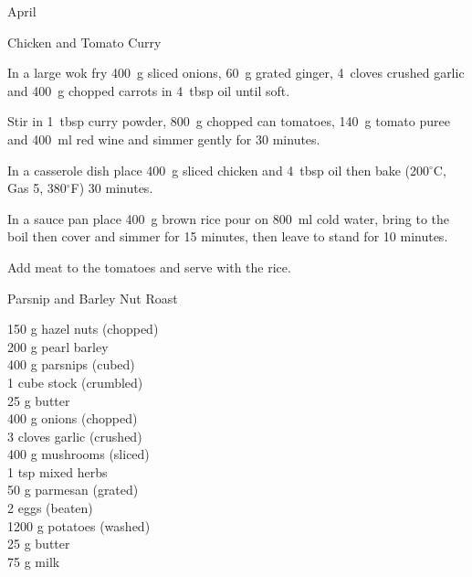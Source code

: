 \begin{menu}{April}
\begin{recipe}{2}{Chicken and Tomato Curry}
    \begin{instructions}
    \item 
        In a large wok fry
        400~g sliced onions,
        60~g grated ginger,
        4~cloves crushed garlic
        and
        400~g chopped carrots
        in
        4~tbsp  oil
        until soft.
      \item 
        Stir in
        1~tbsp  curry powder,
        800~g chopped can tomatoes,
        140~g  tomato puree
        and
        400~ml  red wine
        and simmer gently for 30 minutes.
      \item 
        In a casserole dish place
        400~g sliced chicken
        and
        4~tbsp  oil
        then bake (200$^{\circ}$C, Gas 5, 380$^{\circ}$F) 30 minutes.
      \item 
      In a
      sauce pan
      place
      400~g  brown rice
      pour on
      800~ml  cold water,
      bring to the boil then cover and simmer for 15 minutes,
      then leave to stand for 10 minutes.
    \item 
        Add meat to the tomatoes and serve with the rice.
      
    \end{instructions}
    \end{recipe}%
  
    \begin{recipe}{2}{Parsnip and Barley Nut Roast}%
		\begin{ingredients}
		150 g hazel nuts (chopped) \\
	200 g pearl barley  \\
	400 g parsnips (cubed) \\
	1 cube stock (crumbled) \\
	25 g butter  \\
	400 g onions (chopped) \\
	3 cloves garlic (crushed) \\
	400 g mushrooms (sliced) \\
	1 tsp mixed herbs  \\
	50 g parmesan (grated) \\
	2  eggs (beaten) \\
	1200 g potatoes (washed) \\
	25 g butter  \\
	75 g milk  \\
	
		\end{ingredients}
	

\end{recipe}
\end{menu}
